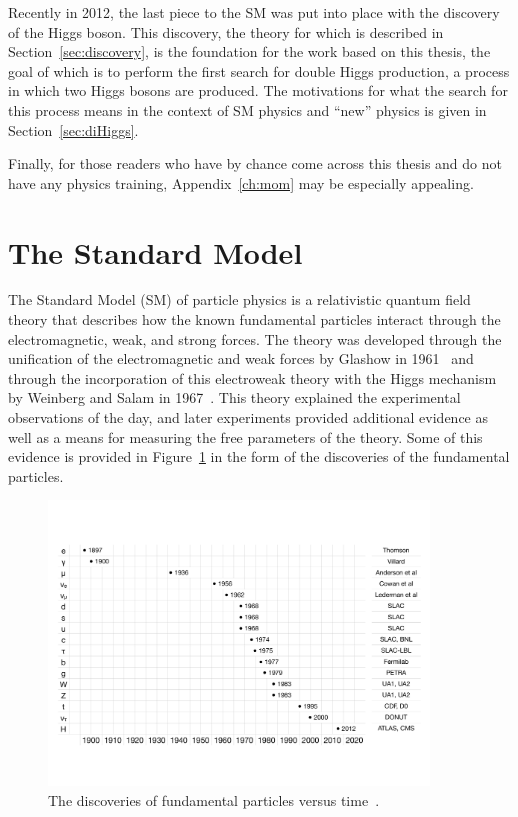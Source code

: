 Recently in 2012, the last piece to the SM was put into place with the discovery of the Higgs boson.
This discovery, the theory for which is described in Section~\ref{sec:discovery},
is the foundation for the work based on
this thesis, the goal of which is to perform the first search for double Higgs production, a process
in which two Higgs bosons are produced. The motivations for what the search for this process means
in the context of SM physics and ``new'' physics is given in Section~\ref{sec:diHiggs}.

Finally, for those readers who have by chance come across this thesis and do not
have any physics training, Appendix~\ref{ch:mom} may be especially appealing.

\section{The Standard Model\label{sec:SM}}

The Standard Model (SM) of particle physics is a relativistic quantum field theory
that describes how the known fundamental particles interact through the electromagnetic, weak,
and strong forces.
The theory was developed through the unification of the electromagnetic and weak forces by Glashow
in 1961~\cite{1961.Glashow.Partial-symmetries} and through the incorporation of this electroweak
theory with the Higgs mechanism by Weinberg and Salam in 1967~\cite{PhysRevLett.19.1264,Salam:1968rm}.
This theory explained the experimental observations of the day, and later experiments provided
additional evidence as well as a means for measuring the free parameters of the theory. Some of
this evidence is provided in Figure~\ref{fig:discoveries} in the form of the discoveries of
the fundamental particles.

\begin{figure}[ht]
 \begin{center}
    \includegraphics[width=0.90\textwidth]{figures/intro/discoveries.pdf}
      \end{center}
\caption{The discoveries of fundamental particles versus time~\cite{Tuna:thesis}.}
\label{fig:discoveries}
\end{figure}

